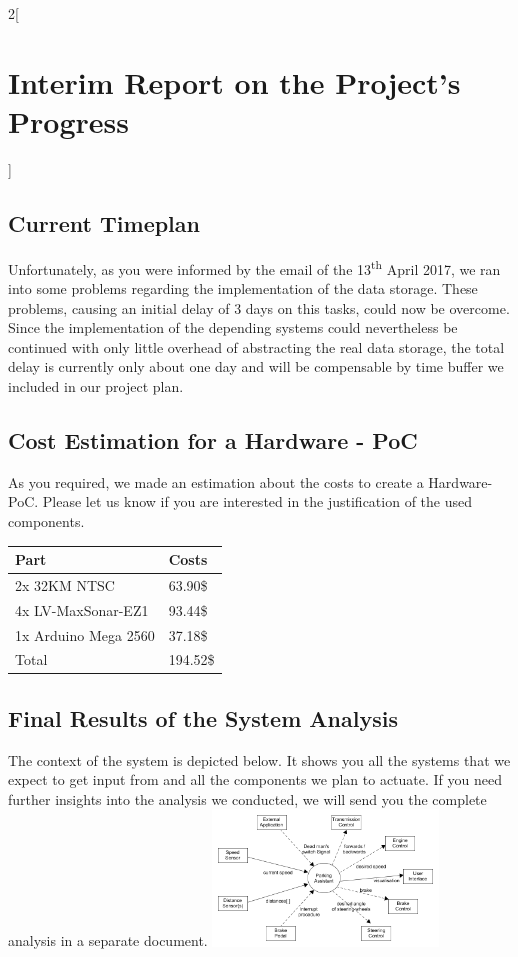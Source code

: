 \documentclass[12pt, a4paper, oneside, british]{report}
\begin{document}
\begin{multicols}{2}[\section{Interim Report on the Project's Progress}]
\subsection{Current Timeplan}
Unfortunately, as you were informed by the email of the 13\textsuperscript{th} April 2017, we ran into some problems regarding the implementation of the data storage. These problems, causing an initial delay of 3 days on this tasks, could now be overcome. Since the implementation of the depending systems could nevertheless be continued with only little overhead of abstracting the real data storage, the total delay is currently only about one day and will be compensable by time buffer we included in our project plan.

\subsection{Cost Estimation for a Hardware - PoC}
As you required, we made an estimation about the costs to create a Hardware-PoC. Please let us know if you are interested in the justification of the used components.

\vspace{0.25cm}
{\footnotesize
\renewcommand{\arraystretch}{1.5}
\begin{tabular}{ll}
Part & Costs \\
\hline
2x 32KM NTSC & \hspace{0.07cm} 63.90\$ \\
4x LV-MaxSonar-EZ1  & \hspace{0.07cm} 93.44\$ \\
1x Arduino Mega 2560 & \hspace{0.07cm} 37.18\$ \\ 
\hline
Total & 194.52\$
\end{tabular}}

\subsection{Final Results of the System Analysis}
The context of the system is depicted below. It shows you all the systems that we expect to get input from and all the components we plan to actuate. If you need further insights into the analysis we conducted, we will send you the complete analysis in a separate document.
\includegraphics[width=0.45\textwidth]{ContextDiagram.png}


\end{multicols}
\end{document}

